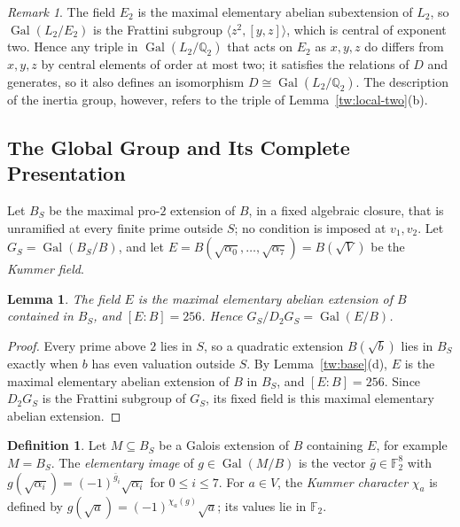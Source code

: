 \documentclass[11pt]{amsart}
\numberwithin{equation}{section}
\newtheorem{lemma}[equation]{Lemma}
\theoremstyle{definition}
\newtheorem{definition}[equation]{Definition}
\theoremstyle{remark}
\newtheorem{remark}[equation]{Remark}
\DeclareMathOperator{\Gal}{Gal}
\newcommand{\Ftwo}{\mathbb F_2}
\newcommand{\Q}{\mathbb Q}
\begin{document}
\begin{remark}\label{tw:triple-remark}
The field $E_2$ is the maximal elementary abelian subextension of $L_2$, so
$\Gal(L_2/E_2)$ is the Frattini subgroup $\langle z^2,[y,z]\rangle$, which is
central of exponent two. Hence any triple in $\Gal(L_2/\Q_2)$ that acts on
$E_2$ as $x,y,z$ do differs from $x,y,z$ by central elements of order at
most two; it satisfies the relations of $D$ and generates, so it also
defines an isomorphism $D\cong\Gal(L_2/\Q_2)$. The description of the
inertia group, however, refers to the triple of
Lemma~\ref{tw:local-two}(b).
\end{remark}

\subsection{The Global Group and Its Complete Presentation}\label{tw:global-section}
Let $B_S$ be the maximal pro-$2$ extension of $B$, in a fixed algebraic
closure, that is unramified at every finite prime outside $S$; no condition
is imposed at $v_1,v_2$. Let $G_S=\Gal(B_S/B)$, and let
$E=B(\sqrt{\alpha_0},\dots,\sqrt{\alpha_7})=B(\sqrt V)$ be the
\emph{Kummer field}.

\begin{lemma}\label{tw:kummer-field}
The field $E$ is the maximal elementary abelian extension of $B$ contained in
$B_S$, and $[E:B]=256$. Hence $G_S/D_2G_S=\Gal(E/B)$.
\end{lemma}

\begin{proof}
Every prime above $2$ lies in $S$, so a quadratic extension $B(\sqrt b)$ lies
in $B_S$ exactly when $b$ has even valuation outside $S$. By
Lemma~\ref{tw:base}(d), $E$ is the maximal elementary abelian extension of
$B$ in $B_S$, and $[E:B]=256$. Since $D_2G_S$ is the Frattini subgroup of
$G_S$, its fixed field is this maximal elementary abelian extension.
\end{proof}

\begin{definition}\label{tw:elementary-image}
Let $M\subseteq B_S$ be a Galois extension of $B$ containing $E$, for
example $M=B_S$. The \emph{elementary image} of $g\in\Gal(M/B)$ is the vector
$\bar g\in\Ftwo^8$ with $g(\sqrt{\alpha_i})=(-1)^{\bar g_i}\sqrt{\alpha_i}$ for
$0\le i\le7$. For $a\in V$, the \emph{Kummer character} $\chi_a$ is defined by
$g(\sqrt a)=(-1)^{\chi_a(g)}\sqrt a$; its values lie in $\Ftwo$.
\end{definition}
\end{document}

